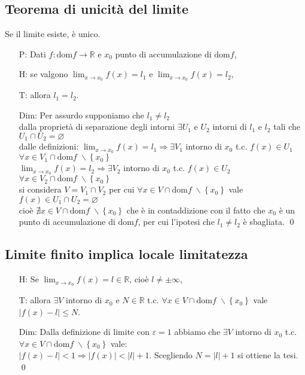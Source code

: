 \documentclass[a4paper]{article}
\newcommand\dom{\text{dom}}
\begin{document}
\subsection{Teorema di unicità del limite}
Se il limite esiste, è unico.
\begin{itemize}
	\item[P:] Dati \(f: \dom f \to \mathbb{R}\) e \(x_0\) punto di accumulazione di \(\dom f\),
	\item[H:] se valgono \(\displaystyle \lim_{x \to x_0} f(x) = l_1\) e \(\displaystyle \lim_{x \to x_0} f(x) = l_2\),
	\item[T:] allora \(l_1 = l_2\).
	\item[Dim:] Per assurdo supponiamo che \(l_1 \neq l_2\) \\
	dalla proprietà di separazione degli intorni \(\exists U_1\) e \(U_2\) intorni di \(l_1\) e \(l_2\) tali che \(U_1 \cap U_2 = \varnothing\) \\
	dalle definizioni: \(\displaystyle \lim_{x \to x_0} f(x) = l_1 \Rightarrow \exists V_1\) intorno di \(x_0\) t.c. \(f(x) \in U_1\) \(\forall x \in V_1 \cap \dom f \; \backslash \left\{ x_0 \right\}\) \\
	\(\displaystyle \lim_{x \to x_0} f(x) = l_2 \Rightarrow \exists V_2\) intorno di \(x_0\) t.c. \(f(x) \in U_2\) \(\forall x \in V_2 \cap \dom f \; \backslash \left\{ x_0 \right\}\) \\
	si considera \(V = V_1 \cap V_2\) per cui \(\forall x \in V \cap \dom f \; \backslash \left\{ x_0 \right\}\) vale \(f(x) \in U_1 \cap U_2 = \varnothing\) \\
	cioè \(\nexists x \in V \cap \dom f \; \backslash \left\{ x_0 \right\}\) che è in contaddizione con il fatto che \(x_0\) è un punto di accumulazione di \(\dom f\),
	per cui l'ipotesi che \(l_1 \neq l_2\) è sbagliata. \qed	
\end{itemize}


\subsection{Limite finito implica locale limitatezza}
\begin{itemize}
	\item[H:] Se \(\displaystyle \lim_{x \to x_0} f(x) = l \in \mathbb{R}\), cioè \(l \neq \pm \infty\),
	\item[T:] allora \(\exists V\) intorno di \(x_0\) e \(N \in \mathbb{R}\) t.c. \(\forall x \in V \cap \dom f \; \backslash \left\{ x_0 \right\}\) vale \(\left| f(x) - l \right| \leq N\).
	\item[Dim:] Dalla definizione di limite con \(\varepsilon = 1\) abbiamo che \(\exists V\) intorno di \(x_0\) t.c. \(\forall x \in V \cap \dom f \; \backslash \left\{ x_0 \right\}\) vale: \\
	\(\left| f(x) - l \right| < 1 \Rightarrow \left| f(x) \right| < \left| l \right| + 1\).	Scegliendo \(N = \left| l \right| + 1\) si ottiene la tesi. \qed 
\end{itemize}
\end{document}
